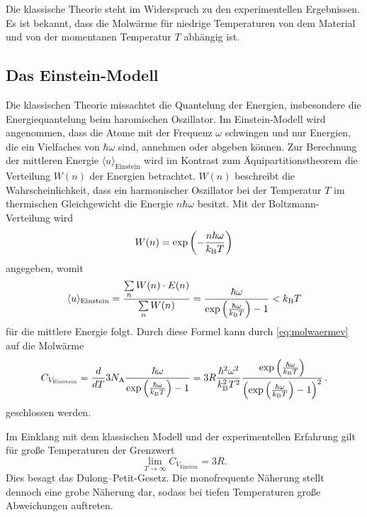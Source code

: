 Die klassische Theorie steht im Widerspruch zu den experimentellen Ergebnissen.
Es ist bekannt, 
dass die Molwärme für niedrige Temperaturen 
von dem Material und von der momentanen Temperatur $T$ abhängig ist.


\subsection{Das Einstein-Modell}
Die klassischen Theorie missachtet die Quantelung der Energien, insbesondere die Energiequantelung beim haromischen Oszillator. 
Im Einstein-Modell wird angenommen, 
dass die Atome mit der Frequenz $\omega$ schwingen und  nur Energien, die ein Vielfaches von $\hbar\omega$ sind, annehmen oder abgeben können.
Zur Berechnung der mittleren Energie $\langle u \rangle _\text{Einstein}$ wird im Kontrast zum Äquipartitionstheorem die Verteilung $W(n)$ der Energien betrachtet. 
$W(n)$ beschreibt die Wahrscheinlichkeit, 
dass ein harmonischer Oszillator 
bei der Temperatur $T$ im thermischen Gleichgewicht die Energie $n\hbar\omega$ besitzt.
Mit der Boltzmann-Verteilung wird
\begin{equation*}
	W(n) = \exp{\left(-\frac{n\hbar \omega}{k_\text B T}\right)}
\end{equation*}
angegeben, womit 
\begin{equation*}
	\langle u \rangle _\text{Einstein} = \frac{\sum\limits_n W(n)\cdot E(n)}{\sum\limits_n W(n)}=	\frac{\hbar\omega}{\exp{\left(\frac{\hbar\omega}{k_\text B T}\right)} - 1}  < k_\text B T
\end{equation*}
für die mittlere Energie folgt.
Durch diese Formel kann durch \eqref{eq:molwaermev} auf die Molwärme
\begin{equation}
	C_{V_\text{Einstein}} = \frac{d}{dT}3 N_\text A \frac{\hbar\omega}{\exp{\left(\frac{\hbar\omega}{k_\text B T}\right)} - 1} = 3R \frac{\hbar^2\omega^2}{k_\text B ^2 T^2} \frac{\exp{\left(\frac{\hbar\omega}{k_\text B T}\right)}}{\left(\exp{\left(\frac{\hbar\omega}{k_\text B T}\right)}-1\right)^2}\,\text.
	\label{eqn:cv}
\end{equation}
geschlossen werden.

Im Einklang mit dem klassischen Modell und der experimentellen Erfahrung gilt für große Temperaturen der Grenzwert
\begin{equation}
	\lim_{T\to\infty} C_{V_\text{Einstein}} = 3R.
\end{equation}
Dies besagt das Dulong--Petit-Gesetz.
Die monofrequente Näherung stellt dennoch eine grobe Näherung dar, 
sodass bei tiefen Temperaturen große Abweichungen auftreten.

